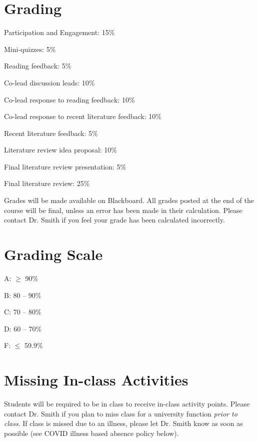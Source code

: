 \documentclass[12pt, notitlepage]{article}   	%
\begin{document}
{\section{Grading}
Participation and Engagement: 15\% \par
Mini-quizzes: 5\% \par
Reading feedback: 5\% \par
Co-lead discussion leads: 10\% \par
Co-lead response to reading feedback: 10\% \par
Co-lead response to recent literature feedback: 10\% \par
Recent literature feedback: 5\% \par
Literature review idea proposal: 10\% \par
Final literature review presentation: 5\% \par
Final literature review: 25\% \par

Grades will be made available on Blackboard. 
All grades posted at the end of the course will be final, 
unless an error has been made in their calculation.
Please contact Dr. Smith if you feel your grade has been calculated incorrectly.

\section{Grading Scale}
A: $\geq$ 90\% \par
B: 80 – 90\% \par
C: 70 – 80\% \par
D: 60 – 70\% \par
F: $\leq$ 59.9\% \par

\section{Missing In-class Activities}
Students will be required to be in class to receive in-class activity points. 
Please contact Dr. Smith if you plan to miss class for a university function 
\textit{prior to class}. If class is missed due to an illness, 
please let Dr. Smith know as soon as possible (see COVID illness based absence policy below).

}
\end{document}

